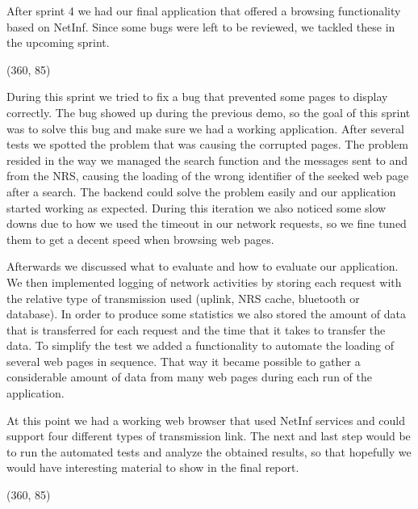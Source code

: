 After sprint 4 we had our final application that offered a browsing functionality
based on NetInf. Since some bugs were left to be reviewed, we tackled these
in the upcoming sprint.

\framebox(360, 85){
}

During this sprint we tried to fix a bug that prevented some pages to display correctly. The bug showed up during the previous demo, so the goal of this sprint was to solve this bug and make sure we had a working application. After several tests we spotted the problem that was causing
the corrupted pages. The problem resided in the way we managed the search function and the messages sent to and from the NRS,
causing the loading of the wrong identifier of the seeked web page after a search. The backend could solve the problem easily and our application
started working as expected. During this iteration we also noticed some slow downs due to how we used the timeout
in our network requests, so we fine tuned them to get a decent speed when browsing web pages.

Afterwards we discussed what to evaluate and how to evaluate our application. We then implemented logging of network
activities by storing each request with the relative type of transmission used (uplink, NRS cache, bluetooth or database).
In order to produce some statistics we also stored the amount of data that is transferred for each request and the time that
it takes to transfer the data. To simplify the test we added a functionality to automate the loading of several web pages
in sequence. That way it became possible to gather a considerable amount of data from many web pages during each run of the application.

At this point we had a working web browser that used NetInf services and could support four different types of transmission link.
The next and last step would be to run the automated tests and analyze the obtained results, so that hopefully we would have interesting material
to show in the final report.

\framebox(360, 85){
}

